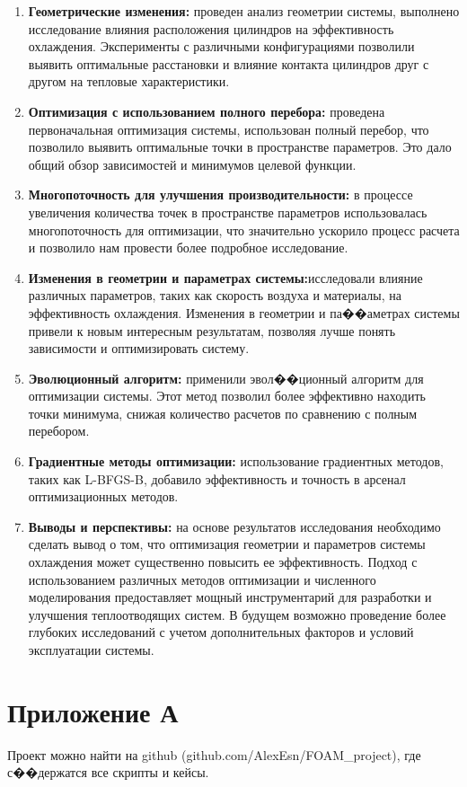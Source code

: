 \documentclass[a4paper,12pt]{extreport}
\numberwithin{equation}{chapter}
\begin{document}
\begin{enumerate}
	\item \textbf{Геометрические изменения:} проведен анализ геометрии системы, выполнено исследование влияния расположения цилиндров на эффективность охлаждения. Эксперименты с различными конфигурациями позволили выявить оптимальные расстановки и влияние контакта цилиндров друг с другом на тепловые характеристики.
	      
	\item \textbf{Оптимизация с использованием полного перебора:} проведена первоначальная оптимизация системы, использован полный перебор, что позволило выявить оптимальные точки в пространстве параметров. Это дало общий обзор зависимостей и минимумов целевой функции.
	      
	\item \textbf{Многопоточность для улучшения производительности:} в процессе увеличения количества точек в пространстве параметров использовалась многопоточность для оптимизации, что значительно ускорило процесс расчета и позволило нам провести более подробное исследование.
	      
	\item \textbf{Изменения в геометрии и параметрах системы:}исследовали влияние различных параметров, таких как скорость воздуха и материалы, на эффективность охлаждения. Изменения в геометрии и па��аметрах системы привели к новым интересным результатам, позволяя лучше понять зависимости и оптимизировать систему.
	      
	\item \textbf{Эволюционный алгоритм:} применили эвол��ционный алгоритм для оптимизации системы. Этот метод позволил более эффективно находить точки минимума, снижая количество расчетов по сравнению с полным перебором.
	      
	\item \textbf{Градиентные методы оптимизации:} использование градиентных методов, таких как L-BFGS-B, добавило эффективность и точность в арсенал оптимизационных методов.
	      
	\item \textbf{Выводы и перспективы:} на основе результатов исследования необходимо сделать вывод о том, что оптимизация геометрии и параметров системы охлаждения может существенно повысить ее эффективность. Подход с использованием различных методов оптимизации и численного моделирования предоставляет мощный инструментарий для разработки и улучшения теплоотводящих систем. В будущем возможно проведение более глубоких исследований с учетом дополнительных факторов и условий эксплуатации системы.
\end{enumerate}

\newpage

\newpage
\section*{Приложение А}
Проект можно найти на github (github.com/AlexEsn/FOAM\_project), где с��держатся все скрипты и кейсы.
\end{document}
